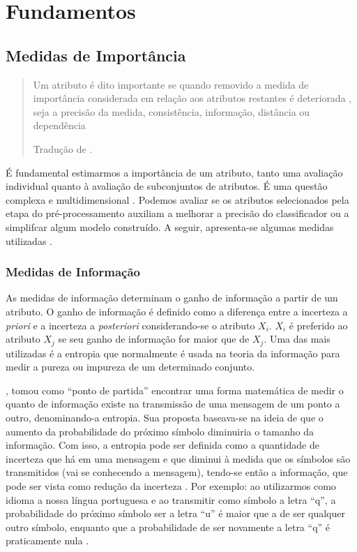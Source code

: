 \documentclass[
]{book}
\begin{document}
\hypertarget{fundamentos}{%
\chapter{Fundamentos}\label{fundamentos}}

\hypertarget{medidasimport}{%
\section{Medidas de Importância}\label{medidasimport}}

\begin{quote}
Um atributo é dito importante se quando removido a medida de importância considerada em relação aos atributos restantes é deteriorada , seja a precisão da medida, consistência, informação, distância ou dependência

Tradução de \citet{liu2012feature}.
\end{quote}

É fundamental estimarmos a importância de um atributo, tanto uma avaliação individual quanto à avaliação de subconjuntos de atributos. É uma questão complexa e multidimensional \citep{liu2012feature}. Podemos avaliar se os atributos selecionados pela etapa do pré-processamento auxiliam a melhorar a precisão do classificador ou a simplifcar algum modelo construído. A seguir, apresenta-se algumas medidas utilizadas \citep{lee2005seleccao}.

\hypertarget{medinfo}{%
\subsection{Medidas de Informação}\label{medinfo}}

As medidas de informação determinam o ganho de informação a partir de um atributo. O ganho de informação é definido como a diferença entre a incerteza a \emph{priori} e a incerteza a \emph{posteriori} considerando-se o atributo \(X_i\). \(X_i\) é preferido ao atributo \(X_j\) se seu ganho de informação for maior que de \(X_j\). Uma das mais utilizadas é a entropia que normalmente é usada na teoria da informação para medir a pureza ou impureza de um determinado conjunto.

\citet{shannon1948mathematical}, tomou como ``ponto de partida'' encontrar uma forma matemática de medir o quanto de informação existe na transmissão de uma mensagem de um ponto a outro, denominando-a entropia. Sua proposta baseava-se na ideia de que o aumento da probabilidade do próximo símbolo diminuiria o tamanho da informação. Com isso, a entropia pode ser definida como a quantidade de incerteza que há em uma mensagem e que diminui à medida que os símbolos são transmitidos (vai se conhecendo a mensagem), tendo-se então a informação, que pode ser vista como redução da incerteza \citep{shannon1948mathematical, paviotti2019consideraccoes}. Por exemplo: ao utilizarmos como idioma a nossa língua portuguesa e ao transmitir como símbolo a letra ``q'', a probabilidade do próximo símbolo ser a letra ``u'' é maior que a de ser qualquer outro símbolo, enquanto que a probabilidade de ser novamente a letra ``q'' é praticamente nula \citep{paviotti2019consideraccoes}.
\end{document}
